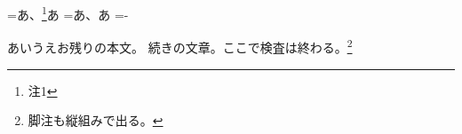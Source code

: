 \documentclass[pdflatex,tate,paper=b5,line_length=20zw]{jlreq}
\begin{document}
\newbox\mk@boxa \newbox\mk@boxb
\setbox\mk@boxa=\hbox{あ、\footnote{注1}あ}%
\setbox\mk@boxb=\hbox{あ、あ}%
\@tempdima=\dimexpr\wd\mk@boxa-\wd\mk@boxb\relax
\ifdim\@tempdima<\z@ \@tempdima=-\@tempdima\fi
\ifdim\@tempdima<0.5pt
  \typeout{MARK-POS: pair glue intact (\the\@tempdima)}%
\else
  \typeout{MARK-POS-FAIL: delta=\the\@tempdima}%
\fi

あいうえお残りの本文。
%
続きの文章。ここで検査は終わる。\footnote{脚注も縦組みで出る。}
\end{document}
